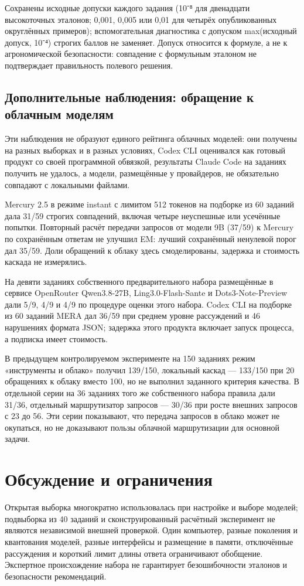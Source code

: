 \documentclass[14pt,a4paper]{extarticle}
\begin{document}
Сохранены исходные допуски каждого задания (10⁻⁸ для двенадцати высокоточных эталонов; 0,001, 0,005 или 0,01 для четырёх опубликованных округлённых примеров); вспомогательная диагностика с допуском max(исходный допуск, 10⁻⁴) строгих баллов не заменяет. Допуск относится к формуле, а не к агрономической безопасности: совпадение с формульным эталоном не подтверждает правильность полевого решения.

\subsection*{Дополнительные наблюдения: обращение к облачным моделям}
Эти наблюдения не образуют единого рейтинга облачных моделей: они получены на разных выборках и в разных условиях, Codex CLI оценивался как готовый продукт со своей программной обвязкой, результаты Claude Code на заданиях получить не удалось, а модели, размещённые у провайдеров, не обязательно совпадают с локальными файлами.

Mercury 2.5 в режиме instant с лимитом 512 токенов на подборке из 60 заданий дала 31/59 строгих совпадений, включая четыре неуспешные или усечённые попытки. Повторный расчёт передачи запросов от модели 9B (37/59) к Mercury по сохранённым ответам не улучшил EM: лучший сохранённый ненулевой порог дал 35/59. Доли обращений к облаку здесь смоделированы, задержка и стоимость каскада не измерялись.

На девяти заданиях собственного предварительного набора размещённые в сервисе OpenRouter Qwen3.8-27B, Ling3.0-Flash-Sante и Dots3-Note-Preview дали 5/9, 4/9 и 4/9 по процедуре оценки этого набора. Codex CLI на подборке из 60 заданий MERA дал 36/59 при среднем уровне рассуждений и 46 нарушениях формата JSON; задержка этого продукта включает запуск процесса, а подписка имеет стоимость.

В предыдущем контролируемом эксперименте на 150 заданиях режим «инструменты и облако» получил 139/150, локальный каскад — 133/150 при 20 обращениях к облаку вместо 100, но не выполнил заданного критерия качества. В отдельной серии на 36 заданиях того же собственного набора правила дали 31/36, отдельный маршрутизатор запросов — 30/36 при росте внешних запросов с 23 до 56. Эти серии показывают, что передача запросов в облако может не окупаться, но не доказывают пользы облачной маршрутизации для основной задачи.

\section*{Обсуждение и ограничения}
Открытая выборка многократно использовалась при настройке и выборе моделей; подвыборка из 40 заданий и сконструированный расчётный эксперимент не являются независимой внешней проверкой. Один компьютер, разные поколения и квантования моделей, разные интерфейсы и размещение в памяти, отключённые рассуждения и короткий лимит длины ответа ограничивают обобщение. Экспертное происхождение набора не гарантирует безошибочности эталонов и безопасности рекомендаций.
\end{document}
